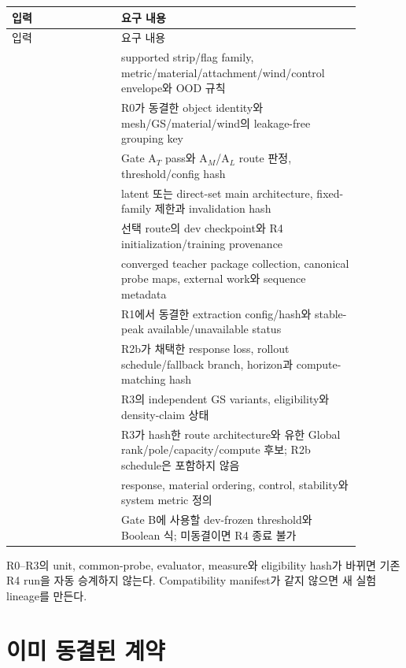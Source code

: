 \documentclass[10pt,a4paper]{article}
\begin{document}
\begin{longtable}{L{0.28\linewidth}L{0.60\linewidth}}
\toprule
입력 & 요구 내용\\
\midrule
\endfirsthead
\toprule
입력 & 요구 내용\\
\midrule
\endhead
{} & supported strip/flag family, metric/material/attachment/wind/control envelope와 OOD 규칙\\
 & R0가 동결한 object identity와 mesh/GS/material/wind의 leakage-free grouping key\\
 & Gate A\(_T\) pass와 A\(_M\)/A\(_L\) route 판정, threshold/config hash\\
 & latent 또는 direct-set main architecture, fixed-family 제한과 invalidation hash\\
 & 선택 route의 dev checkpoint와 R4 initialization/training provenance\\
 & converged teacher package collection, canonical probe maps, external work와 sequence metadata\\
 & R1에서 동결한 extraction config/hash와 stable-peak available/unavailable status\\
 & R2b가 채택한 response loss, rollout schedule/fallback branch, horizon과 compute-matching hash\\
 & R3의 independent GS variants, eligibility와 density-claim 상태\\
 & R3가 hash한 route architecture와 유한 Global rank/pole/capacity/compute 후보; R2b schedule은 포함하지 않음\\
 & response, material ordering, control, stability와 system metric 정의\\
 & Gate B에 사용할 dev-frozen threshold와 Boolean 식; 미동결이면 R4 종료 불가\\
\bottomrule
\end{longtable}

R0--R3의 unit, common-probe, evaluator, measure와 eligibility hash가 바뀌면 기존 R4 run을
자동 승계하지 않는다. Compatibility manifest가 같지 않으면 새 실험 lineage를 만든다.

\section{이미 동결된 계약}
\label{sec:r4-chapter-3}
\end{document}
